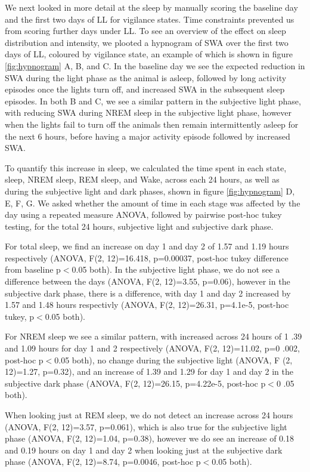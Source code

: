 We next looked in more detail at the sleep by manually scoring the 
baseline day and the first two days of LL for vigilance states. 
Time constraints prevented us from scoring further days under LL.
To see an overview of the effect on sleep distribution and 
intensity, we plooted a hypnogram of SWA over the first two
days of LL, coloured by vigilance state, an example of which is shown 
in figure \ref{fig:hypnogram} A, B, and C.
In the baseline day we see the expected reduction in SWA during the light
phase as the animal is asleep, followed by long activity episodes once the
lights turn off, and increased SWA in the subsequent sleep episodes.
In both B and C, we see a similar pattern in the subjective light phase, 
with reducing SWA during NREM sleep in the subjective light phase, 
however when the lights fail to turn off 
the animals then remain intermittently asleep for the next 6 hours, 
before having a major activity episode followed by increased SWA.

To quantify this increase in sleep, we calculated the time spent in each
state, sleep, NREM sleep, REM sleep, and Wake, across each 24 hours, as well
as during the subjective light and dark phases, shown in figure 
\ref{fig:hypnogram} D, E, F, G.
We asked whether the amount of time in each stage was affected by the day
using a repeated measure ANOVA, followed by pairwise post-hoc tukey testing,
for the total 24 hours, subjective light and subjective dark phase.

For total sleep, we find an increase on day 1 and day 2 of 1.57 and 1.19
hours respectively (ANOVA, F(2, 12)=16.418, p=0.00037, post-hoc tukey
difference from baseline p$<$0.05 both).
In the subjective light phase, we do not see a difference between the days
(ANOVA, F(2, 12)=3.55, p=0.06), however in the subjective dark phase, there
is a difference, with day 1 and day 2 increased by 1.57 and 1.48 hours
respectivly
(ANOVA, F(2, 12)=26.31, p=4.1e-5, post-hoc tukey, p$<$0.05 both).

For NREM sleep we see a similar pattern, with increased across 24 hours of 1
.39 and 1.09 hours for day 1 and 2 respectively (ANOVA, F(2, 12)=11.02, p=0
.002, post-hoc p$<$0.05 both), no change during the subjective light (ANOVA, F
(2, 12)=1.27, p=0.32), and an increase of 1.39 and 1.29 for day 1 and day 2
in the subjective dark phase (ANOVA, F(2, 12)=26.15, p=4.22e-5, post-hoc p$<$0
.05 both).

When looking just at REM sleep, we do not detect an increase across 24 hours
(ANOVA, F(2, 12)=3.57, p=0.061), which is also true for the subjective light
phase (ANOVA, F(2, 12)=1.04, p=0.38), however we do see an increase of 0.18
and 0.19 hours on day 1 and day 2 when
looking just at the subjective dark phase (ANOVA, F(2, 12)=8.74, p=0.0046,
post-hoc p$<$0.05 both).

